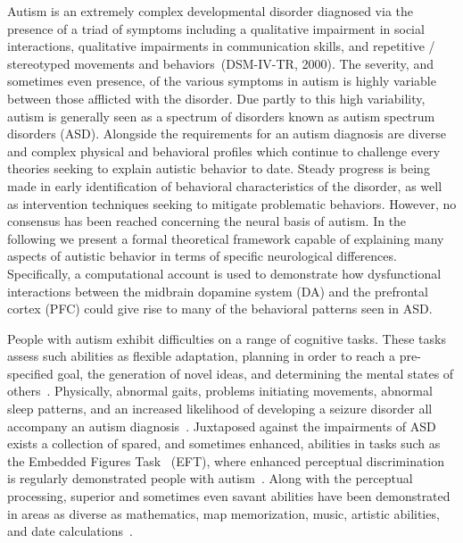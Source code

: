 % 
%

Autism is an extremely complex developmental disorder diagnosed via the presence of a triad of symptoms including a qualitative impairment in social interactions, qualitative impairments in communication skills, and repetitive / stereotyped movements and behaviors~\nocite{RefWorks:98}(DSM-IV-TR, 2000).  The severity, and sometimes even presence, of the various symptoms in autism is highly variable between those afflicted with the disorder.  Due partly to this high variability, autism is generally seen as a spectrum of disorders known as autism spectrum disorders (ASD).  Alongside the requirements for an autism diagnosis are diverse and complex physical and behavioral profiles which continue to challenge every theories seeking to explain autistic behavior to date.  Steady progress is being made in early identification of behavioral characteristics of the disorder, as well as intervention techniques seeking to mitigate problematic behaviors.  However, no consensus has been reached concerning the neural basis of autism.  In the following we present a formal theoretical framework capable of explaining many aspects of autistic behavior in terms of specific neurological differences.  Specifically, a computational account is used to demonstrate how dysfunctional interactions between the midbrain dopamine system (DA) and the prefrontal cortex (PFC) could give rise to many of the behavioral patterns seen in ASD.

People with autism exhibit difficulties on a range of cognitive tasks.  These tasks assess such abilities as flexible adaptation, planning in order to reach a pre-specified goal, the generation of novel ideas, and determining the mental states of others~\cite{BennettoL:1996:AutismPlanningWCST,Ozonoff:1999:AutismStroopWCST,TurnerW:1999:AutismGenerativity,Baron-Cohen:1985:AutismTOM}.  Physically, abnormal gaits, problems initiating movements, abnormal sleep patterns, and an increased likelihood of developing a seizure disorder all accompany an autism diagnosis~\cite{RefWorks:99,RefWorks:100,RefWorks:101,RefWorks:102}.  Juxtaposed against the impairments of ASD exists a collection of spared, and sometimes enhanced, abilities in tasks such as the Embedded Figures Task~\cite{WitkinHA:1971:EFT} (EFT), where enhanced perceptual discrimination is regularly demonstrated people with autism~\cite{RefWorks:103,RefWorks:104}.  Along with the perceptual processing, superior and sometimes even savant abilities have been demonstrated in areas as diverse as mathematics, map memorization, music, artistic abilities, and date calculations~\cite{RefWorks:105,RefWorks:106,RefWorks:107,RefWorks:37}.   

